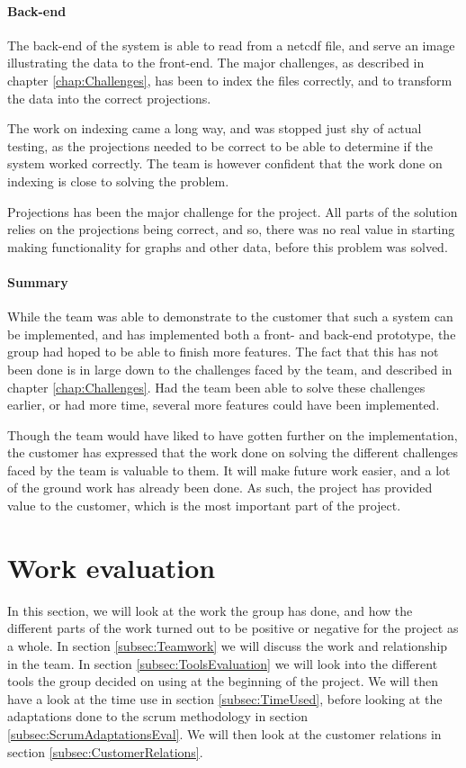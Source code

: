 \documentclass[11pt,a4paper,titlepage,oneside]{report}
\begin{document}
\paragraph{Back-end}
The \gls{back-end} of the system is able to read from a \gls{netcdf} file, and serve an image illustrating the data to the \gls{front-end}. The major challenges, as described in chapter \ref{chap:Challenges}, has been to index the files correctly, and to transform the data into the correct projections. 

The work on indexing came a long way, and was stopped just shy of actual testing, as the projections needed to be correct to be able to determine if the system worked correctly. The team is however confident that the work done on indexing is close to solving the problem.

Projections has been the major challenge for the project. All parts of the solution relies on the projections being correct, and so, there was no real value in starting making functionality for graphs and other data, before this problem was solved. 

\paragraph{Summary} While the team was able to demonstrate to the customer that such a system can be implemented, and has implemented both a front- and back-end \gls{prototype}, the group had hoped to be able to finish more features. The fact that this has not been done is in large down to the challenges faced by the team, and described in chapter \ref{chap:Challenges}. Had the team been able to solve these challenges earlier, or had more time, several more features could have been implemented.

Though the team would have liked to have gotten further on the implementation, the customer has expressed that the work done on solving the different challenges faced by the team is valuable to them. It will make future work easier, and a lot of the ground work has already been done. As such, the project has provided value to the customer, which is the most important part of the project.

\newpage
\section{Work evaluation}
In this section, we will look at the work the group has done, and how the different parts of the work turned out to be positive or negative for the project as a whole. In section \ref{subsec:Teamwork} we will discuss the work and relationship in the team. In section \ref{subsec:ToolsEvaluation} we will look into the different tools the group decided on using at the beginning of the project. We will then have a look at the time use in section \ref{subsec:TimeUsed}, before looking at the adaptations done to the scrum methodology in section \ref{subsec:ScrumAdaptationsEval}. We will then look at the customer relations in section \ref{subsec:CustomerRelations}.
\end{document}
